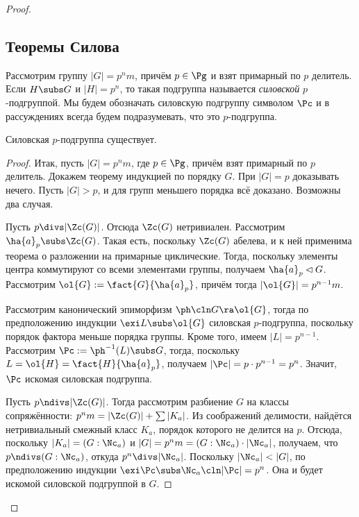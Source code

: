 \documentclass[a4paper]{article}
\begin{document}
\begin{proof}
\subsection{Теоремы Силова}

\begin{df}
Рассмотрим группу $|G| = p^nm$, причём $p \in \Pg$ и взят примарный  по $p$ делитель. Если $H \subs G$ и
$|H|=p^n$, то такая подгруппа называется \emph{силовской} $p$-подгруппой. Мы будем обозначать силовскую
подгруппу символом $\Pc$ и в рассуждениях всегда будем подразумевать, что это $p$-подгруппа.
\end{df}

\begin{theorem}
Силовская $p$-подгруппа существует.
\end{theorem}
\begin{proof}
Итак, пусть $|G|=p^nm$, где $p \in \Pg$, причём взят примарный по  $p$ делитель. Докажем теорему индукцией по
порядку $G$. При $|G| = p$ доказывать нечего. Пусть $|G| > p$, и для групп меньшего порядка всё доказано.
Возможны два случая.

 Пусть $p \divs |\Zc(G)|$. Отсюда $\Zc(G)$ нетривиален.  Рассмотрим $\ha{a}_p \subs \Zc(G)$. Такая
есть, поскольку $\Zc(G)$ абелева, и к ней применима теорема о разложении на примарные циклические. Тогда,
поскольку элементы центра коммутируют со всеми элементами группы, получаем $\ha{a}_p \lhd G$. Рассмотрим
$\ol{G} := \fact{G}{\ha{a}_p}$, причём тогда $|\ol{G}|=p^{n-1}m$.

Рассмотрим канонический эпиморфизм $\ph\cln G \ra \ol{G}$, тогда по  предположению индукции $\exi L \subs
\ol{G}$ силовская $p$-подгруппа, поскольку порядок фактора меньше порядка группы. Кроме того, имеем $|L| =
p^{n-1}$. Рассмотрим $\Pc := \ph^{-1}(L) \subs G$, тогда, поскольку $L = \ol{H} = \fact{H}{\ha{a}_p}$,
получаем $|\Pc| = p \cdot p^{n-1} = p^n$. Значит, $\Pc$ искомая силовская подгруппа.

 Пусть $p \ndivs |\Zc(G)|$. Тогда рассмотрим разбиение $G$ на  классы сопряжённости: $p^nm=|\Zc(G)| +
\sum |K_a|$. Из соображений делимости, найдётся нетривиальный смежный класс $K_a$, порядок которого не
делится на $p$. Отсюда, поскольку $|K_a|=(G:\Nc_a)$ и $|G| = p^nm = (G:\Nc_a) \cdot |\Nc_a|$, получаем, что
$p \ndivs (G:\Nc_a)$, откуда $p^n \divs |\Nc_a|$. Поскольку $|\Nc_a| < |G|$, по предположению индукции $\exi
\Pc \subs \Nc_a\cln |\Pc|=p^n$. Она и будет искомой силовской подгруппой в $G$.
\end{proof}


\end{proof}
\end{document}
